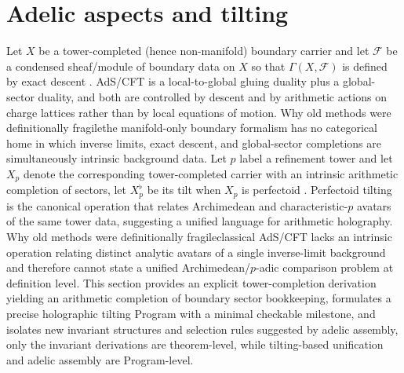 \documentclass[11pt]{article}
\theoremstyle{remark}
\begin{document}
\section{Adelic aspects and tilting}\label{sec:adelic_holo}
Let \(X\) be a tower-completed (hence non-manifold) boundary carrier and let \(\mathcal{F}\) be a condensed sheaf/module of boundary data on \(X\) so that \(\Gamma(X,\mathcal{F})\) is defined by exact descent \cite{ClausenScholze}. AdS/CFT is a local-to-global gluing duality plus a global-sector duality, and both are controlled by descent and by arithmetic actions on charge lattices rather than by local equations of motion. Why old methods were definitionally fragile\:the manifold-only boundary formalism has no categorical home in which inverse limits, exact descent, and global-sector completions are simultaneously intrinsic background data. Let \(p\) label a refinement tower and let \(X_p\) denote the corresponding tower-completed carrier with an intrinsic arithmetic completion of sectors, let \(X_p^{\flat}\) be its tilt when \(X_p\) is perfectoid \cite{Scholze2012}. Perfectoid tilting is the canonical operation that relates Archimedean and characteristic-\(p\) avatars of the same tower data, suggesting a unified language for arithmetic holography. Why old methods were definitionally fragile\:classical AdS/CFT lacks an intrinsic operation relating distinct analytic avatars of a single inverse-limit background and therefore cannot state a unified Archimedean/\(p\)-adic comparison problem at definition level. This section provides an explicit tower-completion derivation yielding an arithmetic completion of boundary sector bookkeeping, formulates a precise holographic tilting Program with a minimal checkable milestone, and isolates new invariant structures and selection rules suggested by adelic assembly, only the invariant derivations are theorem-level, while tilting-based unification and adelic assembly are Program-level.
\end{document}
